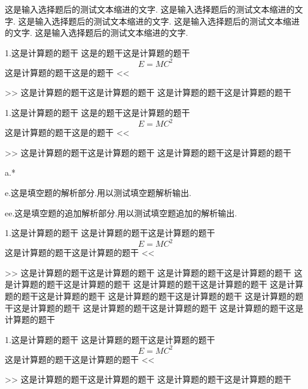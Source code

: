 \documentclass[a4paper,fontset = windowsnew]{ctexbook}
\begin{document}
这是输入选择题后的测试文本缩进的文字.
这是输入选择题后的测试文本缩进的文字.
这是输入选择题后的测试文本缩进的文字.
这是输入选择题后的测试文本缩进的文字.
这是输入选择题后的测试文本缩进的文字.
\newpage
\begin{blanks}[exp]
1.这是计算题的题干
这是的题干这是计算题的题干
\begin{equation}
  E=MC^2
\end{equation}
这是计算题的题干这是的题干
<<
>>
这是计算题的题干这是计算题的题干
这是计算题的题干这是计算题的题干

1.这是计算题的题干
这是的题干这是计算题的题干
\begin{equation}
  E=MC^2
\end{equation}
这是计算题的题干这是的题干
<<
>>
这是计算题的题干这是计算题的题干
这是计算题的题干这是计算题的题干

a.*

e.这是填空题的解析部分.用以测试填空题解析输出.

ee.这是填空题的追加解析部分.用以测试填空题追加的解析输出.

1.这是计算题的题干
这是计算题的题干这是计算题的题干
\begin{equation}
  E=MC^2
\end{equation}
这是计算题的题干这是计算题的题干
<<
>>
这是计算题的题干这是计算题的题干
这是计算题的题干这是计算题的题干
这是计算题的题干这是计算题的题干
这是计算题的题干这是计算题的题干
这是计算题的题干这是计算题的题干
这是计算题的题干这是计算题的题干
这是计算题的题干这是计算题的题干
这是计算题的题干这是计算题的题干
这是计算题的题干这是计算题的题干
  
1.这是计算题的题干
这是计算题的题干这是计算题的题干
\begin{equation}
  E=MC^2
\end{equation}
这是计算题的题干这是计算题的题干
<<
>>
这是计算题的题干这是计算题的题干
这是计算题的题干这是计算题的题干

\end{blanks}
\end{document}
